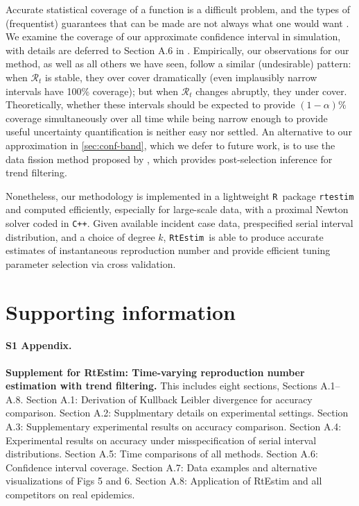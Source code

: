 \documentclass[10pt,letterpaper]{article}
\newcommand{\R}{\texttt{R}}
\newcommand{\cpp}{\texttt{C++}}
\def\RtEstim{\texttt{RtEstim}}
\begin{document}
Accurate statistical coverage of a function is a difficult problem, and the
types of (frequentist) guarantees that can be made are not always what one would
want \cite{genovese2008adaptive}. We examine the coverage of our approximate
confidence interval in simulation, with details are deferred to Section A.6 in
. Empirically, our observations for our method, as well as all
others we have seen, follow a similar (undesirable) pattern: when
$\mathcal{R}_t$ is stable, they over cover dramatically (even implausibly narrow
intervals have 100\% coverage); but when $\mathcal{R}_t$ changes abruptly, they
under cover. Theoretically, whether these intervals should be expected to
provide $(1-\alpha)\%$ coverage simultaneously over all time while being narrow
enough to provide useful uncertainty quantification is neither easy nor settled.
An alternative to our approximation in \autoref{sec:conf-band}, which we defer
to future work, is to use the data fission method proposed by
\cite{leiner2023data}, which provides post-selection inference for trend
filtering.


Nonetheless, our methodology is implemented in a lightweight \R\ package
\texttt{rtestim} and computed efficiently, especially for large-scale data, with
a proximal Newton solver coded in \cpp. Given available incident case data,
prespecified serial interval distribution, and a choice of degree $k$, \RtEstim\
is able to produce accurate estimates of instantaneous reproduction number and
provide efficient tuning parameter selection via cross validation. 

\section*{Supporting information}

\paragraph*{S1 Appendix.}
\label{S1_supp}

{\bf Supplement for RtEstim: Time-varying reproduction number estimation with trend filtering.} 
This includes eight sections, Sections A.1--A.8. Section A.1: Derivation of Kullback Leibler divergence for accuracy comparison. 
Section A.2: Supplmentary details on experimental settings.
Section A.3: Supplementary experimental results on accuracy comparison.
Section A.4: Experimental results on accuracy under misspecification of serial interval distributions.
Section A.5: Time comparisons of all methods.
Section A.6: Confidence interval coverage.
Section A.7: Data examples and alternative visualizations of Figs 5 and 6.
Section A.8: Application of RtEstim and all competitors on real epidemics.
\end{document}
